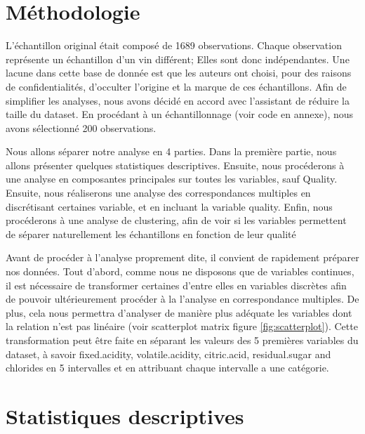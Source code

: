 \documentclass[11pt,a4paper]{article}
\begin{document}
\section{Méthodologie}

L'échantillon original était composé de 1689 observations. Chaque observation représente un échantillon d'un vin différent; Elles sont donc indépendantes. Une lacune dans cette base de donnée est que les auteurs ont choisi, pour des raisons de confidentialités, d'occulter l'origine et la marque de ces échantillons. Afin de simplifier les analyses, nous avons décidé en accord avec l'assistant de réduire la taille du dataset. En procédant à un échantillonnage (voir code en annexe), nous avons sélectionné 200 observations.

Nous allons séparer notre analyse en 4 parties. Dans la première partie, nous allons présenter quelques statistiques descriptives. Ensuite, nous procéderons à une analyse en composantes principales sur toutes les variables, sauf Quality. Ensuite, nous réaliserons une analyse des correspondances multiples en discrétisant certaines variable, et en incluant la variable quality. Enfin, nous procéderons à une analyse de clustering, afin de voir si les variables permettent de séparer naturellement les échantillons en fonction de leur qualité  

Avant de procéder à l'analyse proprement dite, il convient de rapidement préparer nos données. Tout d'abord, comme nous ne disposons que de variables continues, il est nécessaire de transformer certaines d'entre elles en variables discrètes afin de pouvoir ultérieurement procéder à la l'analyse en correspondance multiples. De plus, cela nous permettra d'analyser de manière plus adéquate les variables dont la relation n'est pas linéaire (voir scatterplot matrix figure \ref{fig:scatterplot}). Cette transformation peut être faite en séparant les valeurs des 5 premières variables du dataset, à savoir fixed.acidity, volatile.acidity, citric.acid, residual.sugar and chlorides en 5 intervalles et en attribuant chaque intervalle a une catégorie. 


\section{Statistiques descriptives}
\end{document}

